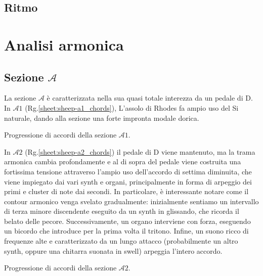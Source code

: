 \documentclass[class=book, crop=false, oneside, 12pt]{standalone}
\begin{document}
    \subsection{Ritmo}

    \section{Analisi armonica}
    \label{sec:03-harmony}

    \subsection*{Sezione \(\mathcal{A}\)}
    La sezione \(\mathcal{A}\) è caratterizzata nella sua quasi totale interezza da un pedale di D. In \(\mathcal{A}1\) (Rg.\ref{sheet:sheep-a1_chords}), L'assolo di Rhodes fa ampio uso del Si naturale, dando alla sezione una forte impronta modale dorica.     
    
    \begin{sheet}[htbp]
        \centering
        \caption{Progressione di accordi della sezione \(\mathcal{A}1\).}
        \label{sheet:sheep-a1_chords}
    \end{sheet}

    In \(\mathcal{A}2\) (Rg.\ref{sheet:sheep-a2_chords}) il pedale di D viene mantenuto, ma la trama armonica cambia profondamente e al di sopra del pedale viene costruita una fortissima tensione attraverso l'ampio uso dell'accordo di settima diminuita, che viene impiegato dai vari synth e organi, principalmente in forma di arpeggio dei primi e cluster di note dai secondi. In particolare, è interessante notare come il contour armonico venga svelato gradualmente: inizialmente sentiamo un intervallo di terza minore discendente eseguito da un synth in glissando, che ricorda il belato delle pecore.
    Successivamente, un organo interviene con forza, eseguendo un bicordo che introduce per la prima volta il tritono. Infine, un suono ricco di frequenze alte e caratterizzato da un lungo attacco (probabilmente un altro synth, oppure una chitarra suonata in swell) arpeggia l'intero accordo. 
    
    \begin{sheet}[htbp]
        \centering
        \caption{Progressione di accordi della sezione \(\mathcal{A}2\).}
        \label{sheet:sheep-a2_chords}
    \end{sheet}
\end{document}
